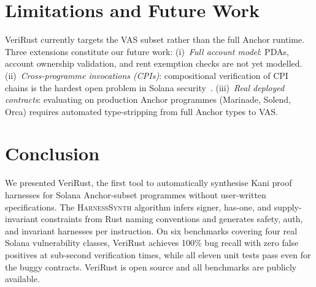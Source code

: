 \documentclass[sigconf,review,anonymous]{acmart}
\begin{document}
\section{Limitations and Future Work}
\label{sec:limits}

VeriRust currently targets the VAS subset rather than the full Anchor
runtime. Three extensions constitute our future work:
(i)~\emph{Full account model}: PDAs, account ownership validation,
and rent exemption checks are not yet modelled.
(ii)~\emph{Cross-programme invocations (CPIs)}: compositional
verification of CPI chains is the hardest open problem in
Solana security~\cite{soteria2021}.
(iii)~\emph{Real deployed contracts}: evaluating on production
Anchor programmes (Marinade, Solend, Orca) requires automated
type-stripping from full Anchor types to VAS.

\section{Conclusion}
\label{sec:conclusion}

We presented VeriRust, the first tool to automatically synthesise
Kani proof harnesses for Solana Anchor-subset programmes without
user-written specifications.
The \textsc{HarnessSynth} algorithm infers signer, has-one, and
supply-invariant constraints from Rust naming conventions and generates
safety, auth, and invariant harnesses per instruction.
On six benchmarks covering four real Solana vulnerability classes,
VeriRust achieves 100\% bug recall with zero false positives at
sub-second verification times, while all eleven unit tests pass even
for the buggy contracts.
VeriRust is open source and all benchmarks are publicly available.



\end{document}
